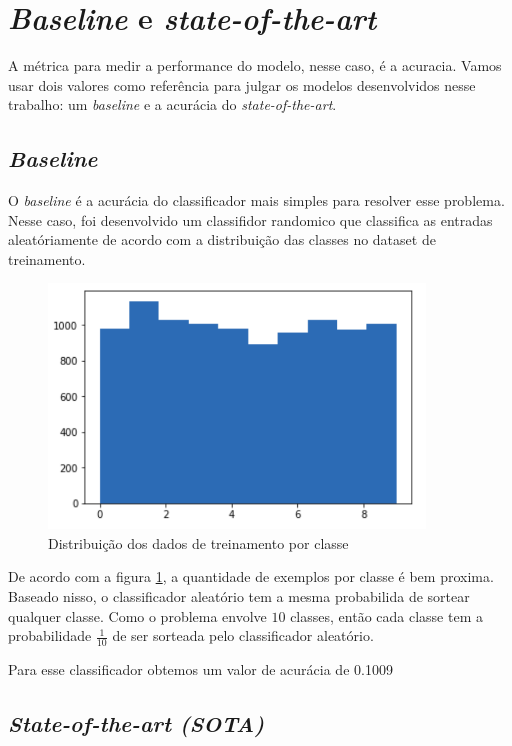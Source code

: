\documentclass[a4paper,10pt]{article}
\begin{document}
\section{\textit{Baseline} e \textit{state-of-the-art}}

A métrica para medir a performance do modelo, nesse caso, é a acuracia. Vamos usar dois valores como referência para julgar os modelos desenvolvidos nesse trabalho: um \textit{baseline} e a acurácia do \textit{state-of-the-art}.

\subsection{\textit{Baseline}}

O \textit{baseline} é a acurácia do classificador mais simples para resolver esse problema. Nesse caso, foi desenvolvido um classifidor randomico que classifica as entradas aleatóriamente de acordo com a distribuição das classes no dataset de treinamento. 

\begin{figure}[h]
        \centering
        \includegraphics[width=10cm]{distribuicao.png}
        \caption{Distribuição dos dados de treinamento por classe}
        \label{fig:distribuicao}
\end{figure}

De acordo com a figura \ref{fig:distribuicao}, a quantidade de exemplos por classe é bem proxima. Baseado nisso, o classificador aleatório tem a mesma probabilida de sortear qualquer classe. Como o problema envolve $10$ classes, então cada classe tem a probabilidade $\frac{1}{10}$ de ser sorteada pelo classificador aleatório.

Para esse classificador obtemos um valor de acurácia de 0.1009

\subsection{\textit{State-of-the-art (SOTA)}}
\end{document}
